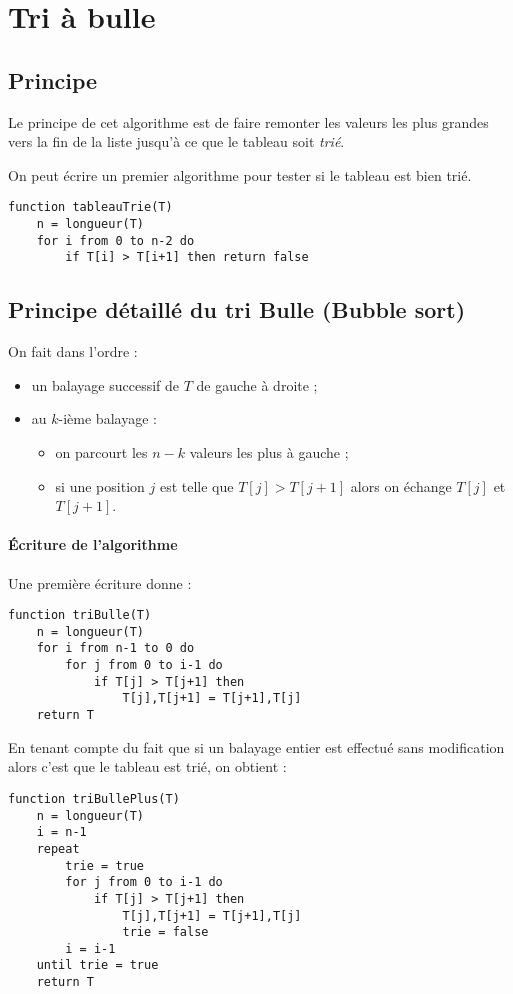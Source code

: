 \documentclass{mybourbaki}
\begin{document}

\section{Tri à bulle}
\subsection{Principe}
Le principe de cet algorithme est de faire \og remonter \fg{} les valeurs les plus grandes vers la fin de la liste jusqu'à ce que le tableau soit \textit{trié}.


On peut écrire un premier algorithme pour tester si le tableau est bien trié.
\begin{lstlisting}
function tableauTrie(T)
	n = longueur(T)
	for i from 0 to n-2 do
		if T[i] > T[i+1] then return false
\end{lstlisting}

\subsection{Principe détaillé du tri Bulle (Bubble sort)}
On fait dans l'ordre :
\begin{itemize}
\item un balayage successif de $T$ de gauche à droite ;
\item au $k$-ième balayage :
\begin{itemize}
\item on parcourt les $n-k$ valeurs les plus à gauche ;
\item si une position $j$ est telle que $T[j] >T[j+1]$ alors on échange $T[j]$ et $T[j+1]$.
\end{itemize}
\end{itemize}

\paragraph{\'Ecriture de l'algorithme}
Une première écriture donne :
\begin{lstlisting}
function triBulle(T)
	n = longueur(T)
	for i from n-1 to 0 do
		for j from 0 to i-1 do
			if T[j] > T[j+1] then
				T[j],T[j+1] = T[j+1],T[j]
	return T			
\end{lstlisting}
En tenant compte du fait que si un balayage entier est effectué sans modification alors c'est que le tableau est trié, on obtient :
\begin{lstlisting}
function triBullePlus(T)
	n = longueur(T)
	i = n-1
	repeat
		trie = true
		for j from 0 to i-1 do
			if T[j] > T[j+1] then
				T[j],T[j+1] = T[j+1],T[j]
				trie = false
		i = i-1	
	until trie = true
	return T	
\end{lstlisting}
\end{document}
